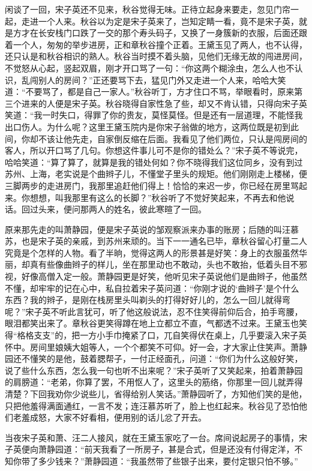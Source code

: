 \documentclass[12pt,UTF8]{ctexbook}
\begin{document}
{{{闲谈了一回，宋子英还不见来，秋谷觉得无味。正待立起身来要走，忽见门帘一起，走进一个人来。秋谷以为定是宋子英来了，岂知定睛一看，竟不是宋子英，就是方才在长安栈门口跌了一交的那个寿头码子，又换了一身簇新的衣服，后面还跟着一个人，匆匆的举步进房，正和章秋谷撞个正着。王黛玉见了两人，也不认得，还只认是和秋谷相识的熟人。秋谷当时摸不着头脑，见他们无缘无故的闯进房间，不觉怒从心起，竖起双眉，刚才开口骂了一句：“你这两个糊涂虫，怎么人也不认识，乱闯别人的房间？”正还要骂下去，猛见门外又走进一个人来，哈哈大笑道：“不要骂了，都是自己一家人。”秋谷听丁，方才住口不骂，举眼看时，原来第三个进来的人便是宋子英。秋谷晓得自家性急了些，却又不肯认错，只得向宋子英笑道：“我一时失口，得罪了你的贵友，莫怪莫怪。但是还有一层道理，不能怪我出口伤人。为什么呢？这里王黛玉院内是你宋子翁做的地方，这两位既是初到此间，你却不该让他先走，自家倒反缩在后面。我看见了他们两位，只认是闯房间的客人，所以开口骂了几句。你想这件事儿可不是你的错处么？”宋子英不等说完，哈哈笑道：“算了算了，就算是我的错处何如？你不晓得我们这位同乡，没有到过苏州、上海，老实说是个曲辫子儿，不懂堂子里头的规矩。他们刚刚走上楼梯，便三脚两步的走进房门，我那里追赶他们得上！恰恰的来迟一步，你已经在房里骂起来。你想想，叫我那里有这么的长脚？”秋谷听了不觉好笑起来，不再去和他说话。回过头来，便问那两人的姓名，彼此寒暄了一回。

原来那先走的叫萧静园，便是宋子英说的邹观察派来办事的账房；后随的叫汪慕苏，也是宋子英的亲戚，到苏州来顽的。当下一一通名已毕，章秋谷留心打量二人究竟是个怎样的人物。看了半晌，觉得这两人的形景甚是好笑：身上的衣服虽然华丽，却真有些像曲辫子的样儿，坐在那里动也不敢动，头也不敢抬，低着头目不邪视，好像高僧入定一般。萧静园更是好笑，他听见宋子英说他们是曲辫子，他虽然不懂，却牢牢的记在心中，私自拉着宋子英问道：“你刚才说的‘曲辫子’是个什么东西？我的辫子，是刚在栈房里头叫剃头的打得好好儿的，怎么一回儿就得弯呢？”宋子英不听此言犹可，听了他这般说法，忍不住笑得前仰后合，拍手弯腰，眼泪都笑出来了。章秋谷更笑得蹲在地上立都立不直，气都透不过来。王黛玉也笑得“格格支支”的，把一方小手巾掩紧了口，兀自笑得伏在桌上，几乎要滚入宋子英怀中。房间里娘姨大姐等人，一个个都笑不可仰。好一会，才大家止住笑声。萧静园还不懂笑的是他，鼓着腮帮子，一付正经面孔，问道：“你们为什么这般好笑，说了些什么东西，怎么我一句也听不出来呢？”宋子英听了又笑起来，拍着萧静园的肩膀道：“老弟，你算了罢，不用怄人了，这里头的筋络，你那里一回儿就弄得清楚？下回我劝你少说些儿，省得给别人笑话。”萧静园听了，方知他们笑的是他，只把他羞得满面通红，一言不发；连汪慕苏听了，脸上也红起来。秋谷见了恐怕他们老羞成怒，大家不好看相，便用别的话儿忿了开去。

当夜宋子英和萧、汪二人接风，就在王黛玉家吃了一台。席间说起房子的事情，宋子英便向萧静园道：“前天我看了一所房子，甚是合式，但是还没有付得定洋，不知你带了多少钱来？”萧静园道：“我虽然带了些银子出来，要付定银只怕不够。”

}}}
\end{document}
